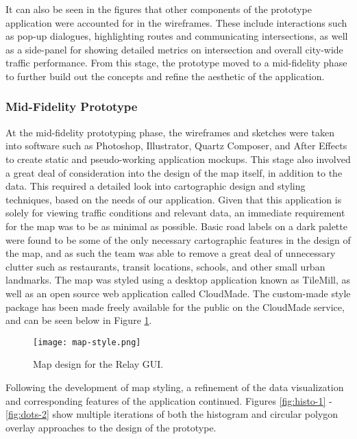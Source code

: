 \documentclass{article}
\begin{document}
It can also be seen in the figures that other components of the prototype application were accounted for in the wireframes.
These include interactions such as pop-up dialogues, highlighting routes and communicating intersections, as well as a side-panel for showing detailed metrics on intersection and overall city-wide traffic performance.
From this stage, the prototype moved to a mid-fidelity phase to further build out the concepts and refine the aesthetic of the application.\\

\subsubsection{Mid-Fidelity Prototype}

At the mid-fidelity prototyping phase, the wireframes and sketches were taken into software such as Photoshop, Illustrator, Quartz Composer, and After Effects to create static and pseudo-working application mockups.
This stage also involved a great deal of consideration into the design of the map itself, in addition to the data.
This required a detailed look into cartographic design and styling techniques, based on the needs of our application.
Given that this application is solely for viewing traffic conditions and relevant data, an immediate requirement for the map was to be as minimal as possible.
Basic road labels on a dark palette were found to be some of the only necessary cartographic features in the design of the map, and as such the team was able to remove a great deal of unnecessary clutter such as restaurants, transit locations, schools, and other small urban landmarks.
The map was styled using a desktop application known as TileMill, as well as an open source web application called CloudMade.
The custom-made style package has been made freely available for the public on the CloudMade service, and can be seen below in Figure \ref{fig:map-styling}.\\

\begin{figure}[htbp!]
  \begin{centering}
    \texttt{[image: map-style.png]}
    \caption{Map design for the Relay GUI.}
    \label{fig:map-styling}
  \end{centering}
\end{figure}

Following the development of map styling, a refinement of the data visualization and corresponding features of the application continued.
Figures \ref{fig:histo-1} - \ref{fig:dots-2} show multiple iterations of both the histogram and circular polygon overlay approaches to the design of the prototype.\\
\end{document}
